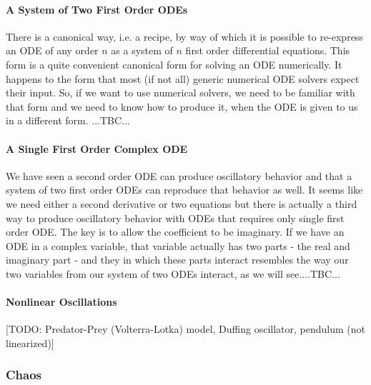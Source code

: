 \paragraph{A System of Two First Order ODEs}
There is a canonical way, i.e. a recipe, by way of which it is possible to re-express an ODE of any order $n$ as a system of $n$ first order differential equations. This form is a quite convenient canonical form for solving an ODE numerically. It happens to the form that most (if not all) generic numerical ODE solvers expect their input. So, if we want to use numerical solvers, we need to be familiar with that form and we need to know how to produce it, when the ODE is given to us in a different form.
...TBC...


\paragraph{A Single First Order Complex ODE}
We have seen a second order ODE can produce oscillatory behavior and that a system of two first order ODEs can reproduce that behavior as well. It seems like we need either a second derivative or two equations but there is actually a third way to produce oscillatory behavior with ODEs that requires only single first order ODE. The key is to allow the coefficient to be imaginary. If we have an ODE in a complex variable, that variable actually has two parts - the real and imaginary part - and they in which these parts interact resembles the way our two variables from our system of two ODEs interact, as we will see....TBC...






\paragraph{Nonlinear Oscillations}
[TODO: Predator-Prey (Volterra-Lotka) model, Duffing oscillator, pendulum (not linearized)]


\subsubsection{Chaos}


